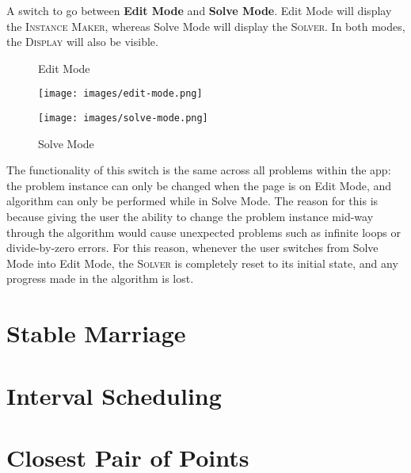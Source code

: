\newline\newline
A switch to go between \textbf{Edit Mode} and \textbf{Solve Mode}. 
Edit Mode will display the \textsc{Instance Maker},
whereas Solve Mode will display the \textsc{Solver}. 
In both modes, the \textsc{Display} will also be visible. 
\begin{figure}[h]
	\caption{Edit Mode}
	\label{fig-edit-mode}
	\texttt{[image: images/edit-mode.png]}
	\centering
	\caption{Solve Mode}
	\label{fig-solve-mode}
	\texttt{[image: images/solve-mode.png]}
	\centering
\end{figure}
\newline\newline
The functionality of this switch is the same across all problems within the app:
the problem instance can only be changed when the page is on Edit Mode, 
and algorithm can only be performed while in Solve Mode. 
The reason for this is because giving the user the ability to change the 
problem instance mid-way through the algorithm would cause unexpected problems
such as infinite loops or divide-by-zero errors. 
For this reason, whenever the user switches from Solve Mode into Edit Mode, 
the \textsc{Solver} is completely reset to its initial state, and any progress
made in the algorithm is lost.
\section{Stable Marriage}
\section{Interval Scheduling}
\section{Closest Pair of Points}